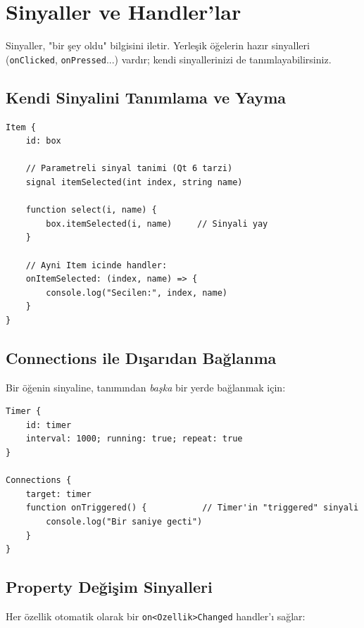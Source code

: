 \documentclass[11pt,a4paper]{article}
\newcommand{\kod}[1]{\texttt{\color{koyuGri}#1}}
\begin{document}
\section{Sinyaller ve Handler'lar}

Sinyaller, "bir şey oldu" bilgisini iletir. Yerleşik öğelerin hazır sinyalleri
(\kod{onClicked}, \kod{onPressed}...) vardır; kendi sinyallerinizi de
tanımlayabilirsiniz.

\subsection{Kendi Sinyalini Tanımlama ve Yayma}

\begin{lstlisting}
Item {
    id: box

    // Parametreli sinyal tanimi (Qt 6 tarzi)
    signal itemSelected(int index, string name)

    function select(i, name) {
        box.itemSelected(i, name)     // Sinyali yay
    }

    // Ayni Item icinde handler:
    onItemSelected: (index, name) => {
        console.log("Secilen:", index, name)
    }
}
\end{lstlisting}

\subsection{Connections ile Dışarıdan Bağlanma}

Bir öğenin sinyaline, tanımından \emph{başka} bir yerde bağlanmak için:

\begin{lstlisting}
Timer {
    id: timer
    interval: 1000; running: true; repeat: true
}

Connections {
    target: timer
    function onTriggered() {           // Timer'in "triggered" sinyali
        console.log("Bir saniye gecti")
    }
}
\end{lstlisting}

\subsection{Property Değişim Sinyalleri}

Her özellik otomatik olarak bir \kod{on\textless Ozellik\textgreater Changed}
handler'ı sağlar:
\end{document}
